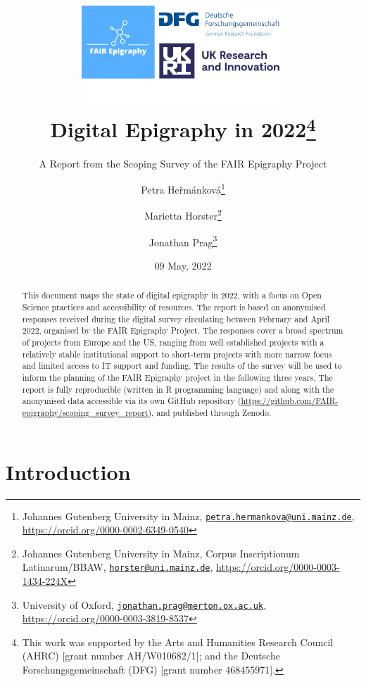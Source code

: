 \documentclass[
  12pt,
]{scrreprt}
\title{\includegraphics[width=3in,height=\textheight]{../assets/banner.png}\\
Digital Epigraphy in 2022\footnote{This work was supported by the Arts
  and Humanities Research Council (AHRC) {[}grant number
  AH/W010682/1{]}; and the Deutsche Forschungsgemeinschaft (DFG)
  {[}grant number 468455971{]}.}}
\subtitle{A Report from the Scoping Survey of the FAIR Epigraphy
Project}
\author{Petra Heřmánková\footnote{Johannes Gutenberg University in
  Mainz,
  \href{mailto:petra.hermankova@uni.mainz.de}{\nolinkurl{petra.hermankova@uni.mainz.de}},
  \url{https://orcid.org/0000-0002-6349-0540}} \and Marietta
Horster\footnote{Johannes Gutenberg University in Mainz, Corpus
  Inscriptionum Latinarum/BBAW,
  \href{mailto:horster@uni.mainz.de}{\nolinkurl{horster@uni.mainz.de}},
  \url{https://orcid.org/0000-0003-1434-224X}} \and Jonathan
Prag\footnote{University of Oxford,
  \href{mailto:jonathan.prag@merton.ox.ac.uk}{\nolinkurl{jonathan.prag@merton.ox.ac.uk}},
  \url{https://orcid.org/0000-0003-3819-8537}}}
\date{09 May, 2022}
\begin{document}
\maketitle
\begin{abstract}
This document maps the state of digital epigraphy in 2022, with a focus
on Open Science practices and accessibility of resources. The report is
based on anonymised responses received during the digital survey
circulating between February and April 2022, organised by the FAIR
Epigraphy Project. The responses cover a broad spectrum of projects from
Europe and the US, ranging from well established projects with a
relatively stable institutional support to short-term projects with more
narrow focus and limited access to IT support and funding. The results
of the survey will be used to inform the planning of the FAIR Epigraphy
project in the following three years. The report is fully reproducible
(written in R programming language) and along with the anonymised data
accessible via its own GitHub repository
(\url{https://github.com/FAIR-epigraphy/scoping_survey_report}), and
published through Zenodo.
\end{abstract}

{
\hypersetup{linkcolor=}
\setcounter{tocdepth}{2}
\tableofcontents
}
\hypertarget{introduction}{%
\chapter{Introduction}\label{introduction}}
\end{document}
